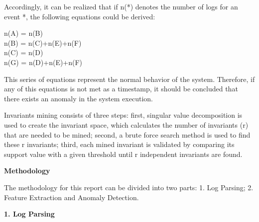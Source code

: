 \documentclass[12pt,a4paper]{article}
\begin{document}
	\noindent Accordingly, it can be realized that if n(*) denotes the number of logs for an event *, the following equations could be derived:
	
	\begin{center}
		n(A) = n(B)\\
		n(B) = n(C)+n(E)+n(F)\\
		n(C) = n(D)\\
		n(G) = n(D)+n(E)+n(F)\\
	\end{center}

	\noindent This series of equations represent the normal behavior of the system. Therefore, if any of this equations is not met as a timestamp, it should be concluded that there exists an anomaly in the system execution.
	
	\vspace{0.15cm}
	
	\noindent Invariants mining consists of three steps: first, singular value decomposition is used to create the invariant space, which calculates the number of invariants (r) that are needed to be mined; second, a brute force search method is used to find these r invariants; third, each mined invariant is validated by comparing its support value with a given threshold until r independent invariants are found.

	\vspace{0.6cm}
	\noindent \textbf{\Large Methodology}
	\vspace{0.5cm}
	
	\noindent The methodology for this report can be divided into two parts: 1. Log Parsing; 2. Feature Extraction and Anomaly Detection.
	
	\vspace{0.4cm}
	\noindent \textbf{\large 1. Log Parsing}
	\vspace{0.3cm}
	
\end{document}
